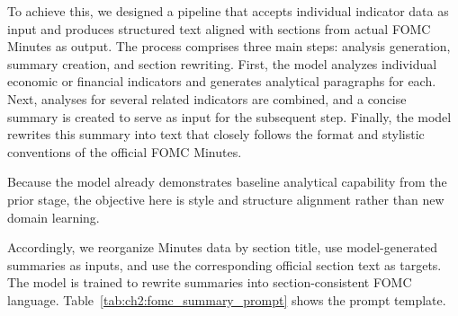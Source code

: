 To achieve this, we designed a pipeline that accepts individual indicator data as input and produces structured text aligned with sections from actual FOMC Minutes as output. The process comprises three main steps: analysis generation, summary creation, and section rewriting. First, the model analyzes individual economic or financial indicators and generates analytical paragraphs for each. Next, analyses for several related indicators are combined, and a concise summary is created to serve as input for the subsequent step. Finally, the model rewrites this summary into text that closely follows the format and stylistic conventions of the official FOMC Minutes.



Because the model already demonstrates baseline analytical capability from the prior stage, the objective here is style and structure alignment rather than new domain learning.



Accordingly, we reorganize Minutes data by section title, use model-generated summaries as inputs, and use the corresponding official section text as targets. The model is trained to rewrite summaries into section-consistent FOMC language. Table~\ref{tab:ch2:fomc_summary_prompt} shows the prompt template.


